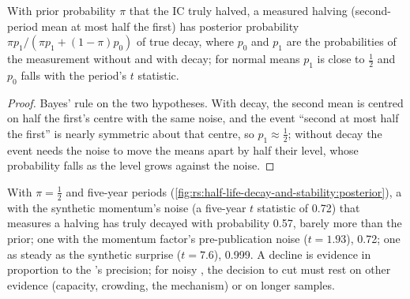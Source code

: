 \begin{proposition}\label{prop:rs:half-life-decay-and-stability:power}
With prior probability $\pi$ that the IC truly halved, a measured halving (second-period mean at most half the first) has posterior probability
$\pi p_1/(\pi p_1 + (1 - \pi)p_0)$ of true decay, where $p_0$ and $p_1$ are the probabilities of the measurement without and with decay; for
normal means $p_1$ is close to $\frac12$ and $p_0$ falls with the period's $t$ statistic.
\end{proposition}

\begin{proof}
Bayes' rule on the two hypotheses. With decay, the second mean is centred on half the first's centre with the same noise, and the event
``second at most half the first'' is nearly symmetric about that centre, so $p_1 \approx \frac12$; without decay the event needs the noise to move
the means apart by half their level, whose probability falls as the level grows against the noise.
\end{proof}

With $\pi = \frac12$ and five-year periods (\cref{fig:rs:half-life-decay-and-stability:posterior}), a  with the synthetic momentum's
noise (a five-year $t$ statistic of 0.72) that measures a halving has truly decayed with probability 0.57, barely more than the prior; one with
the momentum factor's pre-publication noise ($t = 1.93$), 0.72; one as steady as the synthetic surprise ($t = 7.6$), 0.999. A decline is
evidence in proportion to the 's precision; for noisy , the decision to cut must rest on other evidence (capacity, crowding,
the mechanism) or on longer samples.

